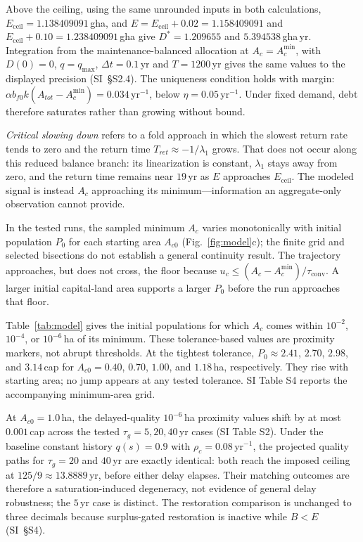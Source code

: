 \documentclass[preprint,12pt,authoryear]{elsarticle}
\newcommand{\Eceil}{E_{\mathrm{ceil}}}
\newcommand{\Acmin}{A_c^{\min}}
\newcommand{\tconv}{\tau_{\mathrm{conv}}}
\begin{document}
Above the ceiling, using the same unrounded inputs in both calculations, $E_{\mathrm{ceil}}=1.138409091$\,gha, and $E=E_{\mathrm{ceil}}+0.02=1.158409091$ and $E_{\mathrm{ceil}}+0.10=1.238409091$\,gha give $D^*=1.209655$ and $5.394538$\,gha\,yr. Integration from the maintenance-balanced allocation at $A_c=\Acmin$, with $D(0)=0$, $q=q_{\max}$, $\Delta t=0.1$\,yr and $T=1200$\,yr gives the same values to the displayed precision (SI~\S S2.4). The uniqueness condition holds with margin: $\alpha b_{f0}k(A_{tot}-\Acmin)=0.034$\,yr$^{-1}$, below $\eta=0.05$\,yr$^{-1}$. Under fixed demand, debt therefore saturates rather than growing without bound.

\emph{Critical slowing down} refers to a fold approach in which the slowest return rate tends to zero and the return time $T_{ret}\approx-1/\lambda_1$ grows. That does not occur along this reduced balance branch: its linearization is constant, $\lambda_1$ stays away from zero, and the return time remains near $19$\,yr as $E$ approaches $\Eceil$. The modeled signal is instead $A_c$ approaching its minimum—information an aggregate-only observation cannot provide.

In the tested runs, the sampled minimum $A_c$ varies monotonically with initial population $P_0$ for each starting area $A_{c0}$ (Fig.~\ref{fig:model}c); the finite grid and selected bisections do not establish a general continuity result. The trajectory approaches, but does not cross, the floor because $u_c\le(A_c-\Acmin)/\tconv$. A larger initial capital-land area supports a larger $P_0$ before the run approaches that floor.

Table~\ref{tab:model} gives the initial populations for which $A_c$ comes within $10^{-2}$, $10^{-4}$, or $10^{-6}$\,ha of its minimum. These tolerance-based values are proximity markers, not abrupt thresholds. At the tightest tolerance, $P_0\approx2.41$, $2.70$, $2.98$, and $3.14$\,cap for $A_{c0}=0.40$, $0.70$, $1.00$, and $1.18$\,ha, respectively. They rise with starting area; no jump appears at any tested tolerance. SI Table S4 reports the accompanying minimum-area grid.

At $A_{c0}=1.0$\,ha, the delayed-quality $10^{-6}$\,ha proximity values shift by at most $0.001$\,cap across the tested $\tau_g=5,20,40$\,yr cases (SI Table S2). Under the baseline constant history $q(s)=0.9$ with $\rho_c=0.08$\,yr$^{-1}$, the projected quality paths for $\tau_g=20$ and $40$\,yr are exactly identical: both reach the imposed ceiling at $125/9\approx13.8889$\,yr, before either delay elapses. Their matching outcomes are therefore a saturation-induced degeneracy, not evidence of general delay robustness; the $5$\,yr case is distinct. The restoration comparison is unchanged to three decimals because surplus-gated restoration is inactive while $B<E$ (SI~\S S4).
\end{document}
